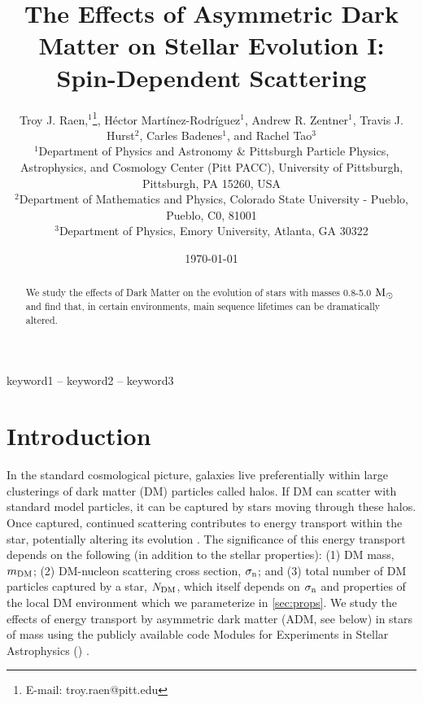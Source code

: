 \documentclass[useAMS,usenatbib]{mnras}
\title[Asymmetric Dark Matter in Stars]{The Effects of Asymmetric Dark Matter on Stellar Evolution I: Spin-Dependent Scattering}
\author[T.J. Raen et al.]{%
Troy J. Raen,$^{1}$\thanks{E-mail: troy.raen@pitt.edu},
Héctor Martínez-Rodríguez$^{1}$,
Andrew R. Zentner$^{1}$,
Travis J. Hurst$^{2}$, \newauthor
Carles Badenes$^{1}$,
and Rachel Tao$^{3}$
\vspace*{12pt}
\\
$^{1}$Department of Physics and Astronomy \& Pittsburgh Particle Physics, Astrophysics, and Cosmology Center (Pitt PACC), University of Pittsburgh, Pittsburgh, PA 15260, USA\\
$^{2}$Department of Mathematics and Physics, Colorado State University -  Pueblo, Pueblo, C0, 81001 \\%
$^{3}$Department of Physics, Emory University, Atlanta, GA 30322
}
\date{\today}
\begin{document}
\label{firstpage}
\pagerange{\pageref{firstpage}--\pageref{lastpage}}
\maketitle


\begin{abstract}
We study the effects of Dark Matter on the evolution of stars with masses 0.8-5.0$\ \mathrm{M}_{\odot}$ and find that, in certain environments, main sequence lifetimes can be dramatically altered. 
\end{abstract}

\begin{keywords}
keyword1 -- keyword2 -- keyword3
\end{keywords}












\vspace{10mm}


\section{Introduction}
\label{sec:intro}

  In the standard cosmological picture, galaxies live preferentially within large clusterings of dark matter (DM) particles called halos. If DM can scatter with standard model particles, it can be captured by stars moving through these halos. Once captured, continued scattering contributes to energy transport within the star, potentially altering its evolution \citep{Spergel1985EffectInterior, Zentner2011AsymmetricDwarfs} . The significance of this energy transport depends on the following (in addition to the stellar properties): (1) DM mass, $m_{\mathrm{DM}}$; (2) DM-nucleon scattering cross section, $\sigma_{\mathrm{n}}$; and (3) total number of DM particles captured by a star, $N_{\mathrm{DM}}$, which itself depends on $\sigma_{\mathrm{n}}$ and properties of the local DM environment which we parameterize in \ref{sec:props}. We study the effects of energy transport by asymmetric dark matter (ADM, see below)  in stars of mass \mrange using the publicly available code Modules for Experiments in Stellar Astrophysics (\mesa) \citep{Paxton2011ModulesMESA}.
\end{document}
